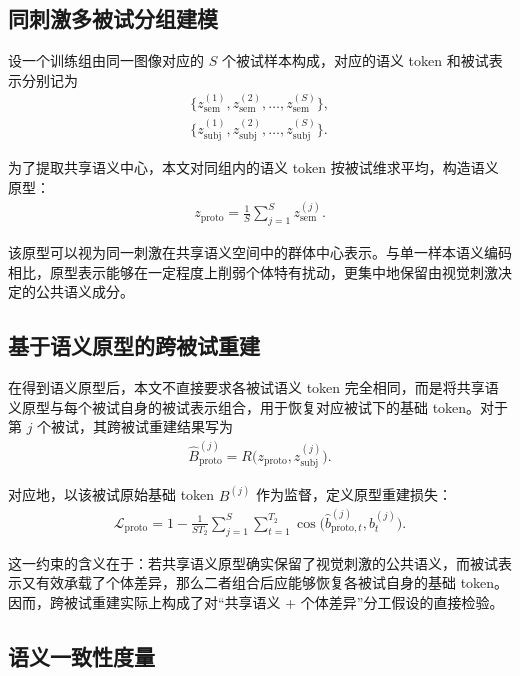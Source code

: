 \subsection{同刺激多被试分组建模}

设一个训练组由同一图像对应的 $S$ 个被试样本构成，对应的语义 token 和被试表示分别记为
\begin{align}
  \{z_{\mathrm{sem}}^{(1)}, z_{\mathrm{sem}}^{(2)}, \dots, z_{\mathrm{sem}}^{(S)}\}, \\
  \{z_{\mathrm{subj}}^{(1)}, z_{\mathrm{subj}}^{(2)}, \dots, z_{\mathrm{subj}}^{(S)}\}.
\end{align}

为了提取共享语义中心，本文对同组内的语义 token 按被试维求平均，构造语义原型：
\begin{align}
  z_{\mathrm{proto}} = \frac{1}{S} \sum_{j=1}^{S} z_{\mathrm{sem}}^{(j)}.
\end{align}

该原型可以视为同一刺激在共享语义空间中的群体中心表示。与单一样本语义编码相比，原型表示能够在一定程度上削弱个体特有扰动，更集中地保留由视觉刺激决定的公共语义成分。

\subsection{基于语义原型的跨被试重建}

在得到语义原型后，本文不直接要求各被试语义 token 完全相同，而是将共享语义原型与每个被试自身的被试表示组合，用于恢复对应被试下的基础 token。对于第 $j$ 个被试，其跨被试重建结果写为
\begin{align}
  \hat{B}_{\mathrm{proto}}^{(j)} = R\bigl(z_{\mathrm{proto}}, z_{\mathrm{subj}}^{(j)}\bigr).
\end{align}

对应地，以该被试原始基础 token $B^{(j)}$ 作为监督，定义原型重建损失：
\begin{align}
  \mathcal{L}_{\mathrm{proto}} = 1 - \frac{1}{S T_2} \sum_{j=1}^{S} \sum_{t=1}^{T_2} \cos\bigl(\hat{b}_{\mathrm{proto},t}^{(j)}, b_t^{(j)}\bigr).
\end{align}

这一约束的含义在于：若共享语义原型确实保留了视觉刺激的公共语义，而被试表示又有效承载了个体差异，那么二者组合后应能够恢复各被试自身的基础 token。因而，跨被试重建实际上构成了对“共享语义 + 个体差异”分工假设的直接检验。

\subsection{语义一致性度量}

